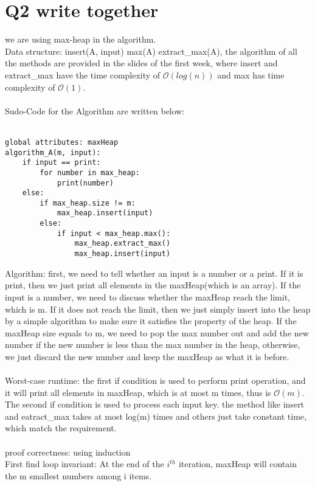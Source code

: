 \documentclass[10pt]{article}
\begin{document}
\section*{Q2 write together}
we are using max-heap in the algorithm.\\
Data structure: insert(A, input) max(A) extract\_max(A), the algorithm of all the methods are provided in the slides of the first week, where insert and extract\_max have the time complexity of $\mathcal{O}(log(n))$ and max has time complexity of $\mathcal{O}(1)$.\\
\\
Sudo-Code for the Algorithm are written below:\\
\\
\begin{lstlisting}[frame=single]
global attributes: maxHeap
algorithm_A(m, input):
	if input == print:
		for number in max_heap:
			print(number)
	else:
		if max_heap.size != m:
			max_heap.insert(input)
		else:
			if input < max_heap.max():
				max_heap.extract_max()
				max_heap.insert(input)
\end{lstlisting}
Algorithm: first, we need to tell whether an input is a number or a print. If it is print, then we just print all elements in the maxHeap(which is an array). If the input is a number, we need to discuss whether the maxHeap reach the limit, which is m. If it does not reach the limit, then we just simply insert into the heap by a simple algorithm to make sure it satisfies the property of the heap. If the maxHeap size equals to m, we need to pop the max number out and add the new number if the new number is less than the max number in the heap, otherwise, we just discard the new number and keep the maxHeap as what it is before.\\
\\
Worst-case runtime: the first if condition is used to perform print operation, and it will print all elements in maxHeap, which is at most m times, thus is $\mathcal{O}(m)$. The second if condition is used to process each input key. the method like insert and eatract\_max takes at most log(m) times and others just take constant time, which match the requirement.\\
\\
proof correctness: using induction\\
First find loop invariant: At the end of the $i^{th}$ iteration, maxHeap will contain the m smallest numbers among i items.
\end{document}
